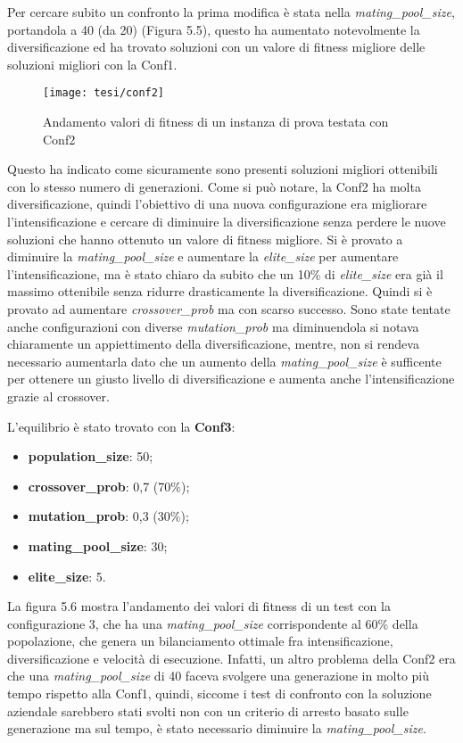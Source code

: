 Per cercare subito un confronto la prima modifica è stata nella \emph{mating\_pool\_size}, portandola a 40 (da 20) (Figura 5.5), questo ha aumentato notevolmente la diversificazione ed ha trovato soluzioni con un valore di fitness migliore delle soluzioni migliori con la Conf1. 

\begin{figure}[!ht] 
    \centering 
    \texttt{[image: tesi/conf2]} 
    \caption{Andamento valori di fitness di un instanza di prova testata con Conf2}
\end{figure}

Questo ha indicato come sicuramente sono presenti soluzioni migliori ottenibili con lo stesso numero di generazioni. Come si può notare, la Conf2 ha molta diversificazione, quindi l'obiettivo di una nuova configurazione era migliorare l'intensificazione e cercare di diminuire la diversificazione senza perdere le nuove soluzioni che hanno ottenuto un valore di fitness migliore. Si è provato a diminuire la \emph{mating\_pool\_size} e aumentare la \emph{elite\_size} per aumentare l'intensificazione, ma è stato chiaro da subito che un 10\% di \emph{elite\_size} era già il massimo ottenibile senza ridurre drasticamente la diversificazione. Quindi si è provato ad aumentare \emph{crossover\_prob} ma con scarso successo. Sono state tentate anche configurazioni con diverse \emph{mutation\_prob} ma diminuendola si notava chiaramente un appiettimento della diversificazione, mentre, non si rendeva necessario aumentarla dato che un aumento della \emph{mating\_pool\_size} è sufficente per ottenere un giusto livello di diversificazione e aumenta anche l'intensificazione grazie al crossover.

\noindent L'equilibrio è stato trovato con la \textbf{Conf3}:
\begin{itemize}
	\item\textbf{population\_size}: 50;
	\item\textbf{crossover\_prob}: 0,7 (70\%);
	\item\textbf{mutation\_prob}: 0,3 (30\%);
	\item\textbf{mating\_pool\_size}: 30;
	\item\textbf{elite\_size}: 5.
\end{itemize}

La figura 5.6 mostra l'andamento dei valori di fitness di un test con la configurazione 3, che ha una \emph{mating\_pool\_size} corrispondente al 60\% della popolazione, che genera un bilanciamento ottimale fra intensificazione, diversificazione e velocità di esecuzione. Infatti, un altro problema della Conf2 era che una \emph{mating\_pool\_size} di 40 faceva svolgere una generazione in molto più tempo rispetto alla Conf1, quindi, siccome i test di confronto con la soluzione aziendale sarebbero stati svolti non con un criterio di arresto basato sulle generazione ma sul tempo, è stato necessario diminuire la \emph{mating\_pool\_size}.

